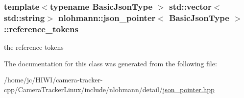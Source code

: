 \subsubsection[{\texorpdfstring{reference\+\_\+tokens}{reference_tokens}}]{\setlength{\rightskip}{0pt plus 5cm}template$<$typename Basic\+Json\+Type $>$ std\+::vector$<$std\+::string$>$ {\bf nlohmann\+::json\+\_\+pointer}$<$ Basic\+Json\+Type $>$\+::reference\+\_\+tokens\hspace{0.3cm}{\ttfamily [private]}}\hypertarget{classnlohmann_1_1json__pointer_a07a990a6838de4f38ee9d881e7b9fd61}{}\label{classnlohmann_1_1json__pointer_a07a990a6838de4f38ee9d881e7b9fd61}


the reference tokens 



The documentation for this class was generated from the following file\+:\begin{DoxyCompactItemize}
\item 
/home/jc/\+H\+I\+W\+I/camera-\/tracker-\/cpp/\+Camera\+Tracker\+Linux/include/nlohmann/detail/\hyperlink{json__pointer_8hpp}{json\+\_\+pointer.\+hpp}\end{DoxyCompactItemize}
